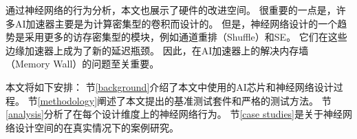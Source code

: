 通过神经网络的行为分析，本文也展示了硬件的改进空间。
很重要的一点是，许多AI加速器主要是为计算密集型的卷积而设计的。
但是，神经网络设计的一个趋势是采用更多的访存密集型的模块，例如通道重排（Shuffle）和SE。
它们在这些边缘加速器上成为了新的延迟瓶颈。
因此，在AI加速器上的解决内存墙（Memory Wall）的问题至关重要。

本文将如下安排：
节\ref{background}介绍了本文中使用的AI芯片和神经网络设计过程。
节\ref{methodology}阐述了本文提出的基准测试套件和严格的测试方法。
节\ref{analysis}分析了在每个设计维度上的神经网络行为。
节\ref{case studies}是关于神经网络设计空间的在真实情况下的案例研究。
